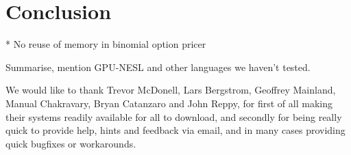 \documentclass[preprint]{sigplanconf}
\begin{document}
\section{Conclusion}
* No reuse of memory in binomial option pricer

Summarise, mention GPU-NESL and other languages we haven't tested.

\acks 

We would like to thank Trevor McDonell, Lars Bergstrom, Geoffrey
Mainland, Manual Chakravary, Bryan Catanzaro and John Reppy, for first
of all making their systems readily available for all to download, and
secondly for being really quick to provide help, hints and feedback
via email, and in many cases providing quick bugfixes or workarounds.





\end{document}
